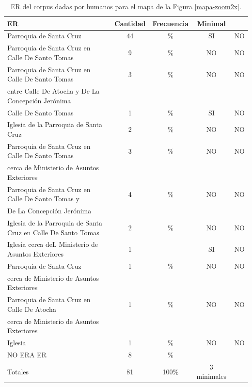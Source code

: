 \begin{table}[h!]
\begin{small}
\begin{center}
\begin{tabular}{|l|c|c|c|c|}
\hline
ER 					      & Cantidad &  Frecuencia & Minimal \\ \hline \hline
Parroquia de Santa Cruz        												 &		44&	\%  & SI &NO \\ \hline
Parroquia de Santa Cruz en Calle De Santo Tomas        &	 9  &	\%	& NO&NO\\ \hline
Parroquia de Santa Cruz en Calle De Santo Tomas        &	 3  &	\%	& NO&NO\\
entre Calle De Atocha y De La Concepci\'on Jer\'onima  &	    &			&  &\\  \hline
Calle De Santo Tomas	        												 &		1 &	\%	&SI&NO\\  \hline
Iglesia de la Parroquia de Santa Cruz	      					 &		2 &	\%	&NO&NO\\  \hline
Parroquia de Santa Cruz en Calle De Santo Tomas  			 &	  3 &	\%	&NO&NO\\  
cerca de Ministerio de Asuntos Exteriores							 &	  &		&\\  \hline
Parroquia de Santa Cruz en Calle De Santo Tomas y      &	 4 &	\%	& NO&NO\\  
De La Concepci\'on Jer\'onima  &	  &					&\\  \hline
Iglesia de la Parroquia de Santa Cruz	en Calle De Santo Tomas      &		2&	\%	&NO&NO\\  \hline
Iglesia cerca deL Ministerio de Asuntos Exteriores				&	 1 &		&SI&NO\\  \hline
Parroquia de Santa Cruz  &	  1&	\%	&NO&NO\\  
cerca de Ministerio de Asuntos Exteriores				&	  &		&&\\  \hline
Parroquia de Santa Cruz en Calle De Atocha  &	  1&	\%	&NO&NO\\  
cerca de Ministerio de Asuntos Exteriores				&	  &		&&\\  \hline
Iglesia				&  1 &	\%	&NO&NO\\  \hline
NO ERA ER				&	8  &	\%	& &\\  \hline
\hline
\hline
Totales	&81	&	100\% &	3 minimales\\
\hline
\end{tabular}
\caption{ER del corpus dadas por humanos para el mapa de la Figura \ref{mapa-zoom2x}.}\label{freq-mapa-zoom2x}
\end{center}
\end{small}
\end{table}

